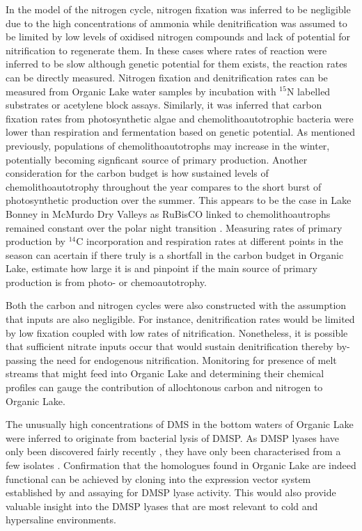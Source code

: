 In the model of the nitrogen cycle, nitrogen fixation was inferred to be negligible due to the high concentrations of ammonia while denitrification was assumed to be limited by low levels of oxidised nitrogen compounds and lack of potential for nitrification to regenerate them.
In these cases where rates of reaction were inferred to be slow although genetic potential for them exists, the reaction rates can be directly measured.
Nitrogen fixation and denitrification rates can be measured from Organic Lake water samples by incubation with $^{15}$N labelled substrates or acetylene block assays.
Similarly, it was inferred that carbon fixation rates from photosynthetic algae and chemolithoautotrophic bacteria were lower than respiration and fermentation based on genetic potential.
As mentioned previously, populations of chemolithoautotrophs may increase in the winter, potentially becoming signficant source of primary production.
Another consideration for the carbon budget is how sustained levels of chemolithoautotrophy throughout the year compares to the short burst of photosynthetic production over the summer.
This appears to be the case in Lake Bonney in McMurdo Dry Valleys as \acs{RuBisCO} linked to chemolithoautrophs remained constant over the polar night transition \cite{Kong2012b}.
Measuring rates of primary production by $^{14}$C incorporation and respiration rates at different points in the season can acertain if there truly is a shortfall in the carbon budget in Organic Lake, estimate how large it is and pinpoint if the main source of primary production is from photo- or chemoautotrophy.

Both the carbon and nitrogen cycles were also constructed with the assumption that inputs are also negligible.
For instance, denitrification rates would be limited by low fixation coupled with low rates of nitrification.
Nonetheless, it is possible that sufficient nitrate inputs occur that would sustain denitrification thereby by-passing the need for endogenous nitrification.
Monitoring for presence of melt streams that might feed into Organic Lake and determining their chemical profiles can gauge the contribution of allochtonous carbon and nitrogen to Organic Lake.

The unusually high concentrations of \ac{DMS} in the bottom waters of Organic Lake were inferred to originate from bacterial lysis of \ac{DMSP}.
As \ac{DMSP} lyases have only been discovered fairly recently \cite{Todd2007, Curson2008}, they have only been characterised from a few isolates \cite{Todd2007, Curson2008, Curson2010, Todd2010, Curson2012}.
Confirmation that the homologues found in Organic Lake are indeed functional can be achieved by cloning into the expression vector system established by \citet{Todd2007} and assaying for \ac{DMSP} lyase activity.
This would also provide valuable insight into the \ac{DMSP} lyases that are most relevant to cold and hypersaline environments.

